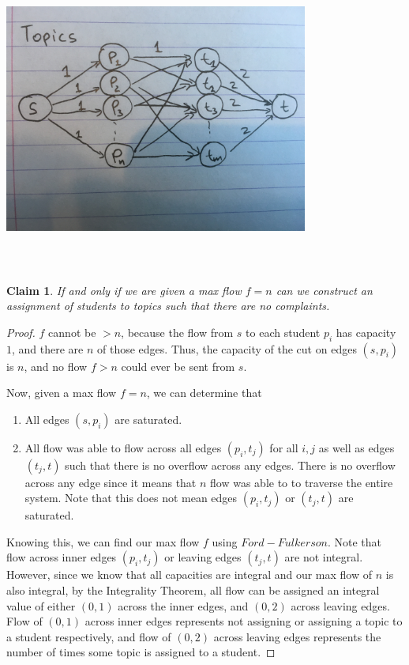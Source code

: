 \documentclass[11pt]{article}
\newtheorem{claim}[theorem]{Claim}
\begin{document}
\begin{center}
\includegraphics[width=10cm,height=10cm,keepaspectratio]{q3_topics}
\end{center}

\begin{claim}
If and only if we are given a max flow $f = n$ can we construct an assignment of students to topics such that there are no complaints.
\end{claim}
\begin{proof}
$f$ cannot be $> n$, because the flow from $s$ to each student $p_i$ has capacity $1$, and there are $n$ of those edges. Thus, the capacity of the cut on edges $(s, p_i)$ is $n$, and no flow $f > n$ could ever be sent from $s$.

Now, given a max flow $f = n$, we can determine that
\begin{enumerate}
\item All edges $(s, p_i)$ are saturated.
\item All flow was able to flow across all edges $(p_i, t_j)$ for all $i, j$ as well as edges $(t_j, t)$ such that there is no overflow across any edges. There is no overflow across any edge since it means that $n$ flow was able to to traverse the entire system. Note that this does not mean edges $(p_i, t_j)$ or $(t_j, t)$ are saturated.
\end{enumerate}

Knowing this, we can find our max flow $f$ using $Ford-Fulkerson$. Note that flow across inner edges $(p_i, t_j)$ or leaving edges $(t_j, t)$ are not integral. However, since we know that all capacities are integral and our max flow of $n$ is also integral, by the Integrality Theorem, all flow can be assigned an integral value of either $(0, 1)$ across the inner edges, and $(0, 2)$ across leaving edges. Flow of $(0,1)$ across inner edges represents not assigning or assigning a topic to a student respectively, and flow of $(0,2)$ across leaving edges represents the number of times some topic is assigned to a student.
\end{proof}
\end{document}
